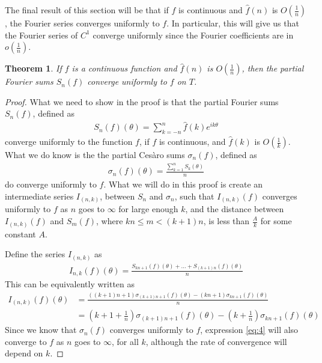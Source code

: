 \documentclass[12pt, titlepage]{article}
\newtheorem{thm}{Theorem}[section]
\theoremstyle{definition}
\begin{document}
The final result of this section will be that if $f$ is continuous and $\widehat{f}(n)$ is $O\left( \frac{1}{n} \right)$, the Fourier series converges uniformly to $f$. In particular, this will give us that the Fourier series of $C^1$ converge uniformly since the Fourier coefficients are in $o\left( \frac{1}{n} \right)$.

\begin{thm}
    If $f$ is a continuous function and $\widehat{f}(n)$ is $O\left( \frac{1}{n} \right)$, then the partial Fourier sums $S_n(f)$ converge uniformly to $f$ on $T$. \cite{bhatia}
\end{thm}

\begin{proof}
    What we need to show in the proof is that the partial Fourier sums $S_n(f)$, defined as
    \begin{align*}
        S_n(f)(\theta) = \sum_{k = -n}^{n} \widehat{f}(k) e^{ik\theta}
    \end{align*}
    converge uniformly to the function $f$, if $f$ is continuous, and $\widehat{f}(k)$ is $O\left( \frac{1}{k} \right)$. What we do know is the the partial Cesàro sums $\sigma_n(f)$, defined as
    \begin{align*}
        \sigma_n(f)(\theta) = \frac{\sum_{k=1}^{n} S_k(\theta)}{n}
    \end{align*}
    do converge uniformly to $f$. What we will do in this proof is create an intermediate series $I_{(n,k)}$, between $S_n$ and $\sigma_n$, such  that $I_{(n,k)}(f)$ converges uniformly to $f$ as $n$ goes to $\infty$ for large enough $k$, and the distance between $I_{(n,k)}(f)$ and $S_m(f)$, where $kn \leq m < (k+1)n$, is less than $\frac{A}{k}$ for some constant $A$.
    
    Define the series $I_{(n,k)}$ as
    \begin{align*}
        I_{n,k}(f)(\theta) = \frac{S_{kn+1}(f)(\theta) + \ldots + S_{(k+1)n}(f)(\theta)}{n}
    \end{align*}
    This can be equivalently written as
    \begin{align}
        I_{(n,k)}(f)(\theta) &= \frac{((k+1)n + 1)\sigma_{(k+1)n + 1}(f)(\theta) - (kn + 1)\sigma_{kn + 1}(f)(\theta)}{n} \\
        &= \left( k+1 + \frac{1}{n} \right)\sigma_{(k+1)n + 1}(f)(\theta) - \left( k + \frac{1}{n} \right)\sigma_{kn + 1}(f)(\theta) \label{eq:4}
    \end{align}
    Since we know that $\sigma_n(f)$ converges uniformly to $f$, expression \ref{eq:4} will also converge to $f$ as $n$ goes to $\infty$, for all $k$, although the rate of convergence will depend on $k$.
    

\end{proof}
\end{document}
